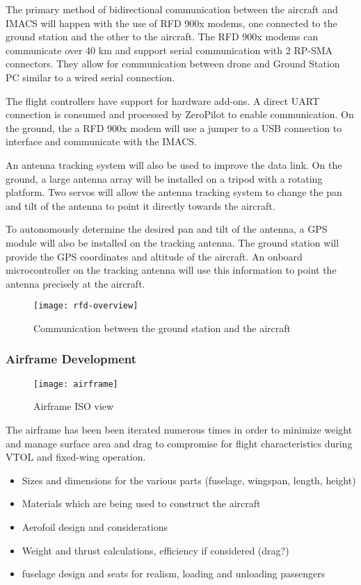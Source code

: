 The primary method of bidirectional communication between the aircraft and
IMACS will happen with the use of RFD 900x modems, one connected to the ground
station and the other to the aircraft. The RFD 900x modems can communicate over
40 km and support serial communication with 2 RP-SMA connectors. They allow for
communication between drone and Ground Station PC similar to a wired serial
connection. 

The flight controllers have support for hardware add-ons. A direct UART
connection is consumed and processed by ZeroPilot to enable communication. On
the ground, the a RFD 900x modem will use a jumper to a USB connection to
interface and communicate with the IMACS.

An antenna tracking system will also be used to improve the data link. On the
ground, a large antenna array will be installed on a tripod with a rotating
platform. Two servos will allow the antenna tracking system to change the pan
and tilt of the antenna to point it directly towards the aircraft.

To autonomously determine the desired pan and tilt of the antenna, a GPS module
will also be installed on the tracking antenna. The ground station will provide
the GPS coordinates and altitude of the aircraft. An onboard microcontroller on
the tracking antenna will use this information to point the antenna precisely
at the aircraft.

\begin{figure}[h]
	\caption{Communication between the ground station and the aircraft}
	\centering
	\texttt{[image: rfd-overview]}
\end{figure}

\subsubsection{Airframe Development}

\begin{figure}[h]
	\caption{Airframe ISO view}
	\centering
	\texttt{[image: airframe]}
\end{figure}

The airframe has been been iterated numerous times in order to minimize weight and
manage surface area and drag to compromise for flight characteristics during VTOL
and fixed-wing operation.


\begin{itemize}
	\item Sizes and dimensions for the various parts (fuselage, wingspan,
		length, height)
	\item Materials which are being used to construct the aircraft
	\item Aerofoil design and considerations
	\item Weight and thrust calculations, efficiency if considered (drag?)
	\item fuselage design and seats for realism, loading and unloading passengers
\end{itemize}

